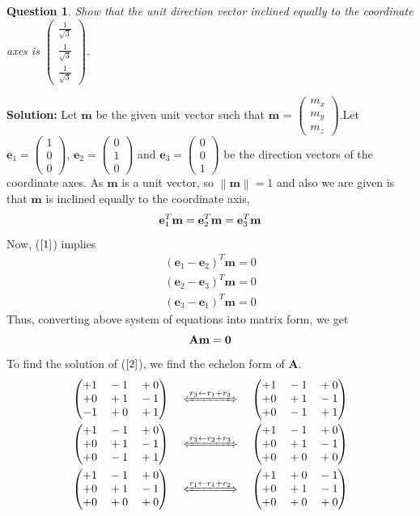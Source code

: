 \documentclass{article}
\newcommand{\solution}{\noindent \textbf{Solution: }}
\newtheorem{question}[theorem]{Question}
\newcommand{\myvec}[1]{\ensuremath{\begin{pmatrix}#1\end{pmatrix}}}
\newcommand{\norm}[1]{\left\lVert#1\right\rVert}
\let\vec\mathbf
\begin{document}
\begin{question}
	Show that the unit direction vector inclined equally to the coordinate axes is $\myvec{\frac{1}{\sqrt{3}} \\ \frac{1}{\sqrt{3}} \\ \frac{1}{\sqrt{3}}}$.
\end{question}
\solution Let $\vec{m}$ be the given unit vector such that $\vec{m}$ = $\myvec{m_x \\ m_y \\ m_z}$.Let $\vec{e}_1=\myvec{1 \\ 0 \\ 0}$, $\vec{e}_2=\myvec{0 \\ 1 \\ 0}$ and $\vec{e}_3=\myvec{0 \\ 0 \\ 1}$ be the direction vectors of the coordinate axes.
As $\vec{m}$ is a unit vector, so $\norm{\vec{m}} =1$ and also we are given is that $\vec{m}$ is inclined equally to the coordinate axis, 
\begin{equation}{\label{1}}
\vec{e}_1^T\vec{m} =\vec{e}_2^T\vec{m}=\vec{e}_3^T\vec{m}
\end{equation}
Now, ($\ref{1}$) implies 
\begin{align}
	(\vec{e}_1 -\vec{e}_2)^T\vec{m} = 0 \\
	(\vec{e}_2 -\vec{e}_3)^T\vec{m} = 0 \\
	(\vec{e}_3 -\vec{e}_1)^T\vec{m} = 0
\end{align}
Thus, converting above system of equations into matrix form, we get
\begin{equation}{\label{2}}
\vec{Am = 0 }
\end{equation}
To find the solution of ($\ref{2}$), we find the  echelon form of  $\vec{A}$.
\begin{align}
& \myvec{+1 \quad  -1 \quad +0 \\ +0 \quad +1 \quad -1 \\ -1 \quad +0 \quad +1 } \quad \xLeftrightarrow[]{r_3 \leftarrow r_1 + r_3} \quad \myvec{+1 \quad  -1 \quad +0 \\ +0 \quad +1 \quad -1 \\ +0 \quad -1 \quad +1 } \\
& \myvec{+1 \quad  -1 \quad +0 \\ +0 \quad +1 \quad -1 \\ +0 \quad -1 \quad +1 } \quad \xLeftrightarrow[]{r_3 \leftarrow r_2 + r_3} \quad \myvec{+1 \quad  -1 \quad +0 \\ +0 \quad +1 \quad -1 \\ +0 \quad +0 \quad +0 } \\
& \myvec{+1 \quad  -1 \quad +0 \\ +0 \quad +1 \quad -1 \\ +0 \quad +0 \quad +0 } \quad \xLeftrightarrow[]{r_1\leftarrow r_1+r_2} \quad  \myvec{+1 \quad  +0 \quad -1 \\ +0 \quad +1 \quad -1 \\ +0 \quad +0 \quad +0 }{\label{3}}
\end{align}
\end{document}
